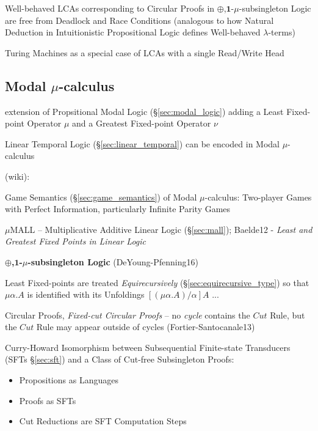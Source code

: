 Well-behaved LCAs corresponding to Circular Proofs in
$\oplus$,$\mathbf{1}$-$\mu$-subsingleton Logic are free from Deadlock
and Race Conditions (analogous to how Natural Deduction in
Intuitionistic Propositional Logic defines Well-behaved
$\lambda$-terms)

Turing Machines as a special case of LCAs with a single Read/Write
Head


\asterism


\subsection{Modal $\mu$-calculus}\label{sec:modal_mu_logic}

extension of Propsitional Modal Logic (\S\ref{sec:modal_logic}) adding
a Least Fixed-point Operator $\mu$ and a Greatest Fixed-point Operator
$\nu$

\fist Linear Temporal Logic (\S\ref{sec:linear_temporal}) can be
encoded in Modal $\mu$-calculus

(wiki):

Game Semantics (\S\ref{sec:game_semantics}) of Modal $\mu$-calculus:
Two-player Games with Perfect Information, particularly Infinite
Parity Games

\asterism

$\mu$MALL -- Multiplicative Additive Linear Logic (\S\ref{sec:mall});
Baelde12 - \emph{Least and Greatest Fixed Points in Linear Logic}

\asterism

\textbf{$\oplus$,$\mathbf{1}$-$\mu$-subsingleton Logic}
(DeYoung-Pfenning16)

Least Fixed-points are treated \emph{Equirecursively}
(\S\ref{sec:equirecursive_type}) so that $\mu\alpha.A$ is identified
with its Unfoldings $[(\mu\alpha.A)/\alpha]A$ ...

Circular Proofs, \emph{Fixed-cut Circular Proofs} -- no \emph{cycle}
contains the $Cut$ Rule, but the $Cut$ Rule may appear outside of
cycles (Fortier-Santocanale13)

Curry-Howard Isomorphism between Subsequential Finite-state
Transducers (SFTs \S\ref{sec:sft}) and a Class of Cut-free
Subsingleton Proofs:
\begin{itemize}
  \item Propositions as Languages
  \item Proofs as SFTs
  \item Cut Reductions are SFT Computation Steps
\end{itemize}

